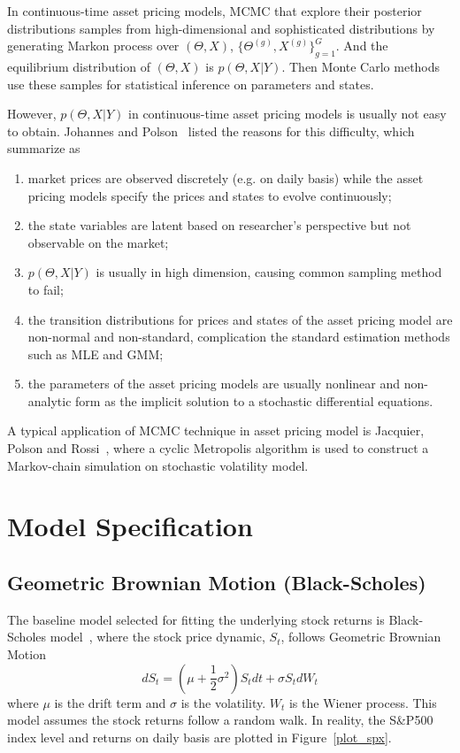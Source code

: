 \documentclass[11pt,reqno,final]{amsart}
\begin{document}
In continuous-time asset pricing models, MCMC that explore their posterior distributions samples from high-dimensional and sophisticated distributions by generating Markon process over $(\Theta,X)$, $\{\Theta^{(g)}, X^{(g)}\}_{g=1}^{G}$. And the equilibrium distribution of $(\Theta,X)$ is $p(\Theta, X|Y)$. Then Monte Carlo methods use these samples for statistical inference on parameters and states.

However, $p(\Theta, X|Y)$ in continuous-time asset pricing models is usually not easy to obtain. Johannes and Polson~\cite{JP02} listed the reasons for this difficulty, which summarize as
\begin{enumerate}
    \item market prices are observed discretely (e.g. on daily basis) while the asset pricing models specify the prices and states to evolve continuously;
    \item the state variables are latent based on researcher's perspective but not observable on the market;
    \item $p(\Theta, X|Y)$ is usually in high dimension, causing common sampling method to fail;
    \item the transition distributions for prices and states of the asset pricing model are non-normal and non-standard, complication the standard estimation methods such as MLE and GMM;
    \item the parameters of the asset pricing models are usually nonlinear and non-analytic form as the implicit solution to a stochastic differential equations.
\end{enumerate}

A typical application of MCMC technique in asset pricing model is Jacquier, Polson and Rossi~\cite{JPR94}, where a cyclic Metropolis algorithm is used to construct a Markov-chain simulation on stochastic volatility model.




\section{Model Specification}
\subsection{Geometric Brownian Motion (Black-Scholes)} \label{bs_section}
The baseline model selected for fitting the underlying stock returns is Black-Scholes model~\cite{BS73}, where the stock price dynamic, $S_t$, follows Geometric Brownian Motion
$$
d S_t = \left(\mu+\frac{1}{2}\sigma^2\right) S_t dt + \sigma S_t dW_t
$$
where $\mu$ is the drift term and $\sigma$ is the volatility. $W_t$ is the Wiener process. This model assumes the stock returns follow a random walk. In reality, the S\&P500 index level and returns on daily basis are plotted in Figure~\ref{plot_spx}.
\end{document}

